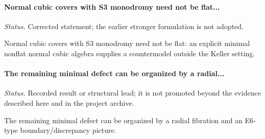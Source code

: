 \label{supp-note-01-041}
\paragraph{Normal cubic covers with S3 monodromy need not be flat...}
\emph{Status.} Corrected statement; the earlier stronger formulation is not adopted.

Normal cubic covers with S3 monodromy need not be flat: an explicit minimal nonflat normal cubic algebra supplies a countermodel outside the Keller setting.

\label{supp-note-01-042}
\paragraph{The remaining minimal defect can be organized by a radial...}
\emph{Status.} Recorded result or structural lead; it is not promoted beyond the evidence described here and in the project archive.

The remaining minimal defect can be organized by a radial fibration and an E6-type boundary/discrepancy picture.

\endgroup

